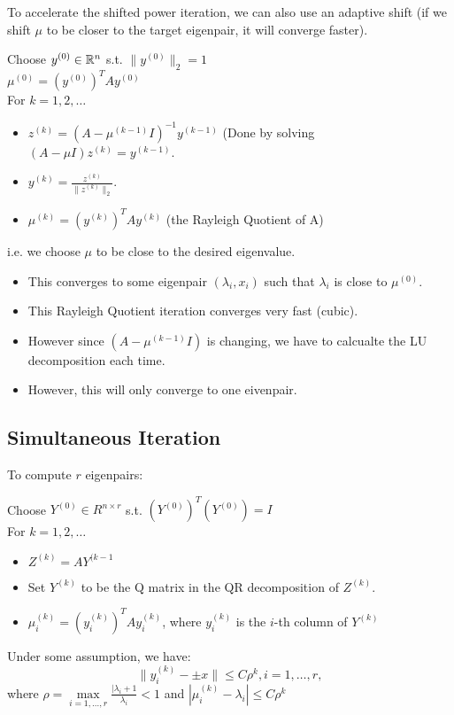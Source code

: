 \documentclass[../main/main.tex]{subfiles}
\begin{document}
To accelerate the shifted power iteration, we can also use an adaptive shift (if we shift $\mu$ to be closer to the target eigenpair, it will converge faster).
\begin{algo}
	Choose $y^{(0)}\in \mathbb{R}^{n}$ s.t. $\|y^{(0)}\|_2=1$\\
	$\mu^{(0)}=(y^{(0)})^{T}Ay^{(0)}$\\
	For $k=1,2,\ldots$
	\begin{itemize}
		\item $z^{(k)}=(A-\mu^{(k-1)} I)^{-1} y^{(k-1)}$ (Done by solving $(A-\mu I)z^{(k)}=y^{(k-1)}$.
		\item $y^{(k)}=\frac{z^{(k)}}{\|z^{(k)}\|_2}$.
		\item $\mu^{(k)}=(y^{(k)})^{T}Ay^{(k)}$ (the Rayleigh Quotient of A)
	\end{itemize}
	\end{algo}
i.e. we choose $\mu$ to be close to the desired eigenvalue.
\begin{itemize}
	\item This converges to some eigenpair $(\lambda_i,x_i)$ such that $\lambda_i$ is close to $\mu^{(0)}$.
	\item This Rayleigh Quotient iteration converges very fast (cubic).
\item However since $(A-\mu^{(k-1)}I)$ is changing, we have to calcualte the LU decomposition each time.
\item However, this will only converge to one eivenpair.
\end{itemize}

\subsection{Simultaneous Iteration}
To compute $r$ eigenpairs: 
\begin{algo} 
	Choose $Y^{(0)}\in R^{n\times r}$ s.t. $(Y^{(0)})^T(Y^{(0)})=I$\\
	For $k=1,2,\ldots$
	\begin{itemize}
		\item $Z^{(k)}=AY^{(k-1}$ 
		\item Set  $Y^{(k)}$ to be the Q matrix in the QR decomposition of  $Z^{(k)}$.
		\item $\mu_i^{(k)}=(y_i^{(k)})^TAy_i^{(k)}$, where $y_i^{(k)}$ is the $i$-th column of $Y^{(k)}$
	\end{itemize}
\end{algo}
	Under some assumption, we have:
	\[
		\|y_i^{(k)}-\pm x\|\le C\rho^{k}, i=1,\ldots,r
	,\] where $\rho=\max\limits_{i=1,\ldots,r}\frac{|\lambda_i+1}{\lambda_i}<1$ and $|\mu_i^{(k)}-\lambda_i|\le C\rho^k$
\end{document}
